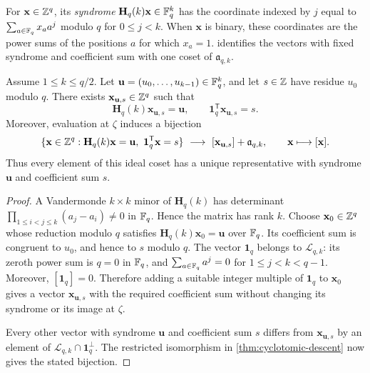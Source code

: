 For $\mathbf x\in\mathbb Z^q$, its \emph{syndrome}
$\mathbf H_q(k)\mathbf x\in\mathbb F_q^k$ has the coordinate indexed by
$j$ equal to
$\sum_{a\in\mathbb F_q}x_aa^j$ modulo $q$ for $0\le j<k$.  When $\mathbf x$ is
binary, these coordinates are the power sums of the positions $a$ for which
$x_a=1$.   identifies the vectors with fixed syndrome
and coefficient sum with one coset of $\mathfrak a_{q,k}$.

\begin{lemma}
\label{lem:coset-syndrome}
Assume $1\le k\le q/2$.  Let
$\mathbf u=(u_0,\ldots,u_{k-1})\in\mathbb F_q^k$, and let $s\in\mathbb Z$ have
residue $u_0$ modulo $q$.  There exists $\mathbf x_{\mathbf u,s}\in\mathbb Z^q$
such that
\[
 \mathbf H_q(k)\mathbf x_{\mathbf u,s}=\mathbf u,
 \qquad
 \mathbf1_q^{\mathsf T}\mathbf x_{\mathbf u,s}=s.
\]
Moreover, evaluation at $\zeta$ induces a bijection
\[
 \{\mathbf x\in\mathbb Z^q:
   \mathbf H_q(k)\mathbf x=\mathbf u,
   \ \mathbf1_q^{\mathsf T}\mathbf x=s\}
 \ \longrightarrow\
 [\mathbf x_{\mathbf u,s}]+\mathfrak a_{q,k},
 \qquad \mathbf x\longmapsto[\mathbf x].
\]
Thus every element of this ideal coset has a unique representative with
syndrome $\mathbf u$ and coefficient sum $s$.
\end{lemma}

\begin{proof}
A Vandermonde $k\times k$ minor of $\mathbf H_q(k)$ has determinant
$\prod_{1\le i<j\le k}(a_j-a_i)\ne0$ in $\mathbb F_q$.  Hence the matrix has
rank $k$.  Choose $\mathbf x_0\in\mathbb Z^q$ whose reduction modulo $q$
satisfies $\mathbf H_q(k)\mathbf x_0=\mathbf u$ over $\mathbb F_q$.
Its coefficient sum is congruent to $u_0$, and hence to $s$ modulo $q$.
The vector $\mathbf1_q$ belongs to $\mathcal L_{q,k}$: its zeroth power sum is
$q=0$ in $\mathbb F_q$, and
$\sum_{a\in\mathbb F_q}a^j=0$ for $1\le j<k<q-1$.  Moreover,
$[\mathbf1_q]=0$.  Therefore adding a suitable integer multiple of
$\mathbf1_q$ to $\mathbf x_0$ gives a vector $\mathbf x_{\mathbf u,s}$ with
the required coefficient sum without changing its syndrome or its image at
$\zeta$.

Every other vector with syndrome $\mathbf u$ and coefficient sum $s$ differs
from $\mathbf x_{\mathbf u,s}$ by an element of
$\mathcal L_{q,k}\cap\mathbf1_q^\perp$.  The restricted isomorphism in
\cref{thm:cyclotomic-descent} now gives the stated bijection.
\end{proof}


